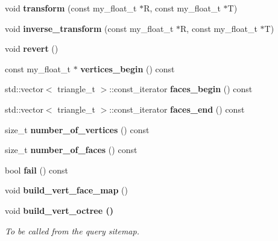 \begin{CompactItemize}
\item 
void \textbf{transform} (const my\_\-float\_\-t $\ast$R, const my\_\-float\_\-t $\ast$T)\label{classSimSite3D_1_1SimpleTrimesh_62c0d274f674d05c9db0ca18aea2db11}

\item 
void \textbf{inverse\_\-transform} (const my\_\-float\_\-t $\ast$R, const my\_\-float\_\-t $\ast$T)\label{classSimSite3D_1_1SimpleTrimesh_5a59c678cf6712f29f796144cf8c87de}

\item 
void \textbf{revert} ()\label{classSimSite3D_1_1SimpleTrimesh_5310633ed75943845498b55b60793de5}

\item 
const my\_\-float\_\-t $\ast$ \textbf{vertices\_\-begin} () const \label{classSimSite3D_1_1SimpleTrimesh_0241ee914bc4009b298dcbf4f8509b0c}

\item 
std::vector$<$ triangle\_\-t $>$::const\_\-iterator \textbf{faces\_\-begin} () const \label{classSimSite3D_1_1SimpleTrimesh_a3884b72a389a2db888fdbfe87e9d18b}

\item 
std::vector$<$ triangle\_\-t $>$::const\_\-iterator \textbf{faces\_\-end} () const \label{classSimSite3D_1_1SimpleTrimesh_f460bb83919675913193bb8271b65b53}

\item 
size\_\-t \textbf{number\_\-of\_\-vertices} () const \label{classSimSite3D_1_1SimpleTrimesh_e5fa28939fe7b60139c77490226b7c19}

\item 
size\_\-t \textbf{number\_\-of\_\-faces} () const \label{classSimSite3D_1_1SimpleTrimesh_fb3840ef015be2eba2295d7527241687}

\item 
bool \textbf{fail} () const \label{classSimSite3D_1_1SimpleTrimesh_851505ebe0adff90db508c9f3f0e467f}

\item 
void \textbf{build\_\-vert\_\-face\_\-map} ()\label{classSimSite3D_1_1SimpleTrimesh_ec6e3af8fdf30ae9975017c727922700}

\item 
void \bf{build\_\-vert\_\-octree} ()\label{classSimSite3D_1_1SimpleTrimesh_e7086080fb8f55f239829a61ba081c21}

\begin{CompactList}\small\item\em To be called from the query sitemap. \item\end{CompactList}\end{CompactItemize}
